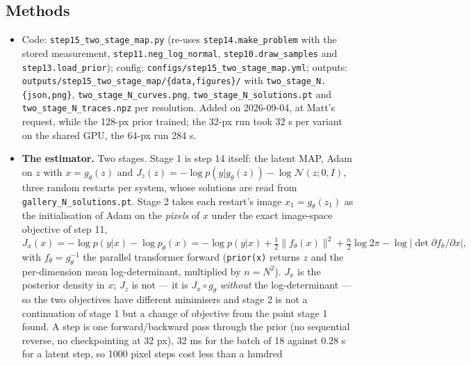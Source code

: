 \documentclass[11pt]{article}
\begin{document}
\subsection{Methods}
\begin{itemize}
  \item \begin{sloppypar}Code: \texttt{step15\_two\_stage\_map.py} (re-uses
        \texttt{step14.make\_problem} with the stored measurement,
        \texttt{step11.neg\_log\_normal}, \texttt{step10.draw\_samples} and
        \texttt{step13.load\_prior}); config:
        \texttt{configs/\allowbreak step15\_two\_stage\_map.yml}; outputs:
        \texttt{outputs/step15\_two\_stage\_map/\{data,figures\}/} with
        \texttt{two\_stage\_N.\{json,png\}}, \texttt{two\_stage\_N\_curves.png},
        \texttt{two\_stage\_N\_solutions.pt} and
        \texttt{two\_stage\_N\_traces.npz} per resolution. Added on
        2026-09-04, at Matt's request, while the 128-px prior trained; the
        32-px run took 32 s per variant on the shared GPU, the 64-px run
        284 s.\end{sloppypar}
  \item \textbf{The estimator.} Two stages. Stage 1 is step 14 itself: the
        latent MAP, Adam on $z$ with $x = g_\theta(z)$ and
        $J_z(z) = -\log p(y|g_\theta(z)) - \log\mathcal{N}(z;0,I)$, three
        random restarts per system, whose solutions are read from
        \texttt{gallery\_N\_solutions.pt}. Stage 2 takes each restart's
        image $x_1 = g_\theta(z_1)$ as the initialisation of Adam on the
        \emph{pixels} of $x$ under the exact image-space objective of step
        11,
        \[
          J_x(x) = -\log p(y|x) - \log p_\theta(x)
                 = -\log p(y|x) + \tfrac12\|f_\theta(x)\|^2 + \tfrac{n}{2}\log 2\pi
                   - \log\bigl|\det \partial f_\theta/\partial x\bigr|,
        \]
        with $f_\theta = g_\theta^{-1}$ the parallel transformer forward
        (\texttt{prior(x)} returns $z$ and the per-dimension mean
        log-determinant, multiplied by $n = N^2$). $J_x$ is the posterior
        density in $x$; $J_z$ is not --- it is $J_x \circ g_\theta$
        \emph{without} the log-determinant --- so the two objectives have
        different minimisers and stage 2 is not a continuation of stage 1
        but a change of objective from the point stage 1 found. A step is
        one forward/backward pass through the prior (no sequential reverse,
        no checkpointing at 32 px), 32 ms for the batch of 18 against 0.28 s
        for a latent step, so 1000 pixel steps cost less than a hundred

\end{itemize}
\end{document}
